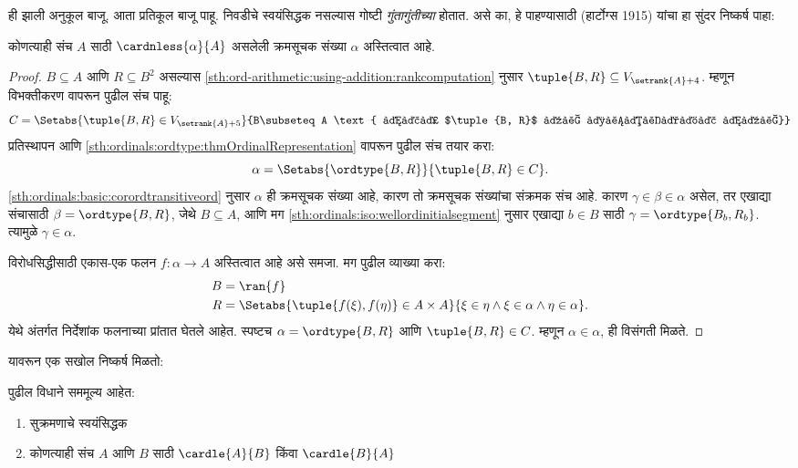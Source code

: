 ही झाली अनुकूल बाजू. आता प्रतिकूल बाजू पाहू. निवडीचे स्वयंसिद्धक नसल्यास गोष्टी \emph{गुंतागुंतीच्या} होतात. असे का, हे पाहण्यासाठी (हार्टोग्स 1915) यांचा हा सुंदर निष्कर्ष पाहा:

\begin{lem}[\emph{$\ZF$ मध्ये}]\label{sth:choice:hartogs:HartogsLemma}
कोणत्याही संच $A$ साठी $\cardnless{\alpha}{A}$ असलेली क्रमसूचक संख्या $\alpha$ अस्तित्वात आहे.
\end{lem}

\begin{proof}
$B \subseteq A$ आणि $R \subseteq B^2$ असल्यास \ref{sth:ord-arithmetic:using-addition:rankcomputation} नुसार $\tuple{B, R} \subseteq
V_{\setrank{A}+4}$. म्हणून विभक्तीकरण वापरून पुढील संच पाहू:
\[
	C = \Setabs{\tuple{B, R} \in V_{\setrank{A}+5}}{B\subseteq A
	\text{ आणि $\tuple{B, R}$ हे सुक्रमण आहे}}
\]
प्रतिस्थापन आणि \ref{sth:ordinals:ordtype:thmOrdinalRepresentation} वापरून पुढील संच तयार करा:
\[
	\alpha = \Setabs{\ordtype{B, R}}{\tuple{B, R} \in C}.
\]
\ref{sth:ordinals:basic:corordtransitiveord} नुसार $\alpha$ ही क्रमसूचक संख्या आहे, कारण तो क्रमसूचक संख्यांचा संक्रमक संच आहे. कारण $\gamma \in \beta \in \alpha$ असेल, तर एखाद्या संचासाठी $\beta = \ordtype{B, R}$, जेथे $B \subseteq A$, आणि मग \ref{sth:ordinals:iso:wellordinitialsegment} नुसार एखाद्या $b
\in B$ साठी $\gamma = \ordtype{B_b, R_b}$. त्यामुळे $\gamma \in \alpha$.


विरोधसिद्धीसाठी एकास-एक फलन $f \colon \alpha \to A$ अस्तित्वात आहे असे समजा. मग पुढील व्याख्या करा:
\begin{align*}
	B &= \ran{f}\\
	R &= \Setabs{\tuple{f(\xi), f(\eta)} \in A \times A}{\xi \in \eta \land \xi \in \alpha \land \eta \in \alpha}.
\end{align*}
येथे अंतर्गत निर्देशांक फलनाच्या प्रांतात घेतले आहेत. स्पष्टच $\alpha = \ordtype{B, R}$ आणि $\tuple{B, R} \in C$. म्हणून $\alpha
\in \alpha$, ही विसंगती मिळते.
\end{proof}

यावरून एक सखोल निष्कर्ष मिळतो:

\begin{thm}[\emph{$\ZF$ मध्ये}]
पुढील विधाने सममूल्य आहेत:
\begin{enumerate}
	\item\label{sth:choice:hartogs:equivwo} सुक्रमणाचे स्वयंसिद्धक
	\item\label{sth:choice:hartogs:equivcompare} कोणत्याही संच $A$ आणि $B$ साठी $\cardle{A}{B}$ किंवा
	$\cardle{B}{A}$
\end{enumerate}
\end{thm}

